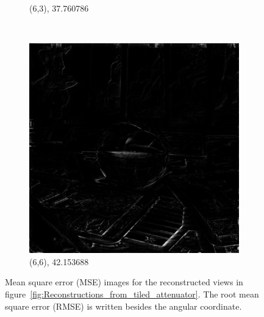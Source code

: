 \documentclass[11pt,a4paper,titlepage]{article}
\begin{document}
\begin{figure}
\begin{subfigure}[t]{0.3\textwidth}
		\caption{(6,3), 37.760786}
	\end{subfigure}%
	~
	\begin{subfigure}[t]{0.3\textwidth}
		\includegraphics[width=\textwidth]{results/tile_blending/tarot6x6x512x512-512x512x5-sampling=2x_tileRes=200x200_overlap=0.5/MSE_for_view_(6,6).png}
		\caption{(6,6), 42.153688}
	\end{subfigure}%
	
	\caption{Mean square error (MSE) images for the reconstructed views in figure~\ref{fig:Reconstructions_from_tiled_attenuator}. The root mean square error (RMSE) is written besides the angular coordinate.}
	\label{fig:MSE_for_reconstructions_from_tiled_attenuator}
\end{figure}

\clearpage


\end{document}
